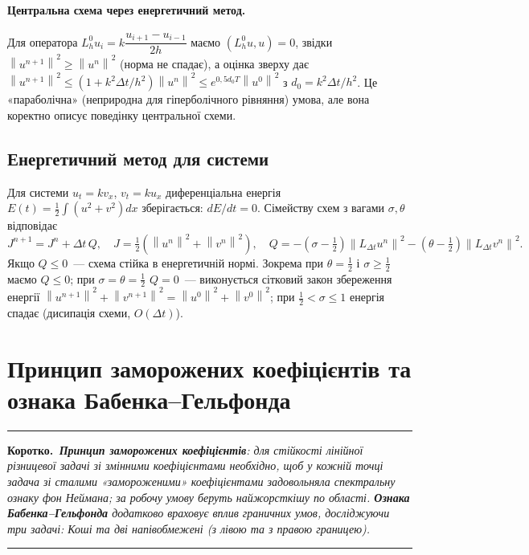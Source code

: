\documentclass[12pt,a4paper]{article}
\theoremstyle{definition}
\theoremstyle{plain}
\newenvironment{korotko}
  {\par\medskip\noindent\begingroup\color{accent!75!black}\rule{\linewidth}{0.4pt}\par
   \noindent\textbf{Коротко.}\itshape\,}
  {\par\noindent\rule{\linewidth}{0.4pt}\endgroup\medskip}
\newcommand{\norm}[1]{\left\lVert #1 \right\rVert}
\begin{document}
\paragraph{Центральна схема через енергетичний метод.} Для оператора
$L_h^0 u_i=k\dfrac{u_{i+1}-u_{i-1}}{2h}$ маємо $(L_h^0 u,u)=0$, звідки
$\norm{u^{n+1}}^2\ge\norm{u^n}^2$ (норма не спадає), а оцінка зверху дає
$\norm{u^{n+1}}^2\le(1+k^2\Delta t/h^2)\norm{u^n}^2\le e^{0,5 d_0 T}\norm{u^0}^2$
з $d_0=k^2\Delta t/h^2$. Це «параболічна» (неприродна для гіперболічного
рівняння) умова, але вона коректно описує поведінку центральної схеми.

\subsection{Енергетичний метод для системи}
Для системи $u_t=k v_x$, $v_t=k u_x$ диференціальна енергія
$E(t)=\tfrac12\int(u^2+v^2)dx$ зберігається: $dE/dt=0$. Сімейству схем з
вагами $\sigma,\theta$ відповідає
\[
  J^{n+1}=J^n+\Delta t\,Q,\quad
  J=\tfrac12(\norm{u^n}^2+\norm{v^n}^2),\quad
  Q=-(\sigma-\tfrac12)\norm{L_{\Delta t}u^n}^2-(\theta-\tfrac12)\norm{L_{\Delta t}v^n}^2 .
\]
Якщо $Q\le0$~--- схема стійка в енергетичній нормі. Зокрема при
$\theta=\tfrac12$ і $\sigma\ge\tfrac12$ маємо $Q\le0$; при
$\sigma=\theta=\tfrac12$ $Q=0$~--- виконується сітковий закон збереження
енергії $\norm{u^{n+1}}^2+\norm{v^{n+1}}^2=\norm{u^0}^2+\norm{v^0}^2$;
при $\tfrac12<\sigma\le1$ енергія спадає (дисипація схеми, $O(\Delta t)$).

\newpage
\section{Принцип заморожених коефіцієнтів та ознака Бабенка--Гельфонда}

\begin{korotko}
\textbf{Принцип заморожених коефіцієнтів}: для стійкості лінійної
різницевої задачі зі змінними коефіцієнтами \emph{необхідно}, щоб у
кожній точці задача зі сталими «замороженими» коефіцієнтами задовольняла
спектральну ознаку фон Неймана; за робочу умову беруть найжорсткішу по
області. \textbf{Ознака Бабенка--Гельфонда} додатково враховує вплив
\emph{граничних умов}, досліджуючи три задачі: Коші та дві
напівобмежені (з лівою та з правою границею).
\end{korotko}
\end{document}
